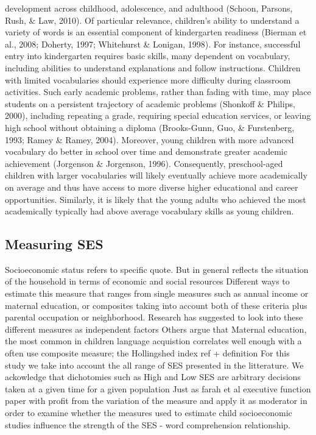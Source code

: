 \documentclass[english,man]{apa6}
\theoremstyle{definition}
\theoremstyle{definition}
\theoremstyle{definition}
\theoremstyle{remark}
\begin{document}
development across childhood, adolescence, and adulthood (Schoon,
Parsons, Rush, \& Law, 2010). Of particular relevance, children's
ability to understand a variety of words is an essential component of
kindergarten readiness (Bierman et al., 2008; Doherty, 1997; Whitehurst
\& Lonigan, 1998). For instance, successful entry into kindergarten
requires basic skills, many dependent on vocabulary, including abilities
to understand explanations and follow instructions. Children with
limited vocabularies should experience more difficulty during classroom
activities. Such early academic problems, rather than fading with time,
may place students on a persistent trajectory of academic problems
(Shonkoff \& Philips, 2000), including repeating a grade, requiring
special education services, or leaving high school without obtaining a
diploma (Brooks-Gunn, Guo, \& Furstenberg, 1993; Ramey \& Ramey, 2004).
Moreover, young children with more advanced vocabulary do better in
school over time and demonstrate greater academic achievement (Jorgenson
\& Jorgenson, 1996). Consequently, preschool-aged children with larger
vocabularies will likely eventually achieve more academically on average
and thus have access to more diverse higher educational and career
opportunities. Similarly, it is likely that the young adults who
achieved the most academically typically had above average vocabulary
skills as young children.

\subsection{Measuring SES}\label{measuring-ses}

Socioeconomic status refers to specific quote. But in general reflects
the situation of the household in terms of economic and social resources
Different ways to estimate this measure that ranges from single measures
such as annual income or maternal education, or composites taking into
account both of these criteria plus parental occupation or neighborhood.
Research has suggested to look into these different measures as
independent factors Others argue that Maternal education, the most
common in children language acquistion correlates well enough with a
often use composite measure; the Hollingshed index ref + definition For
this study we take into account the all range of SES presented in the
litterature. We ackowledge that dichotomies such as High and Low SES are
arbitrary decisions taken at a given time for a given population Just as
farah et al executive function paper with profit from the variation of
the measure and apply it as moderator in order to examine whether the
measures used to estimate child socioeconomic studies influence the
strength of the SES - word comprehension relationship.
\end{document}
